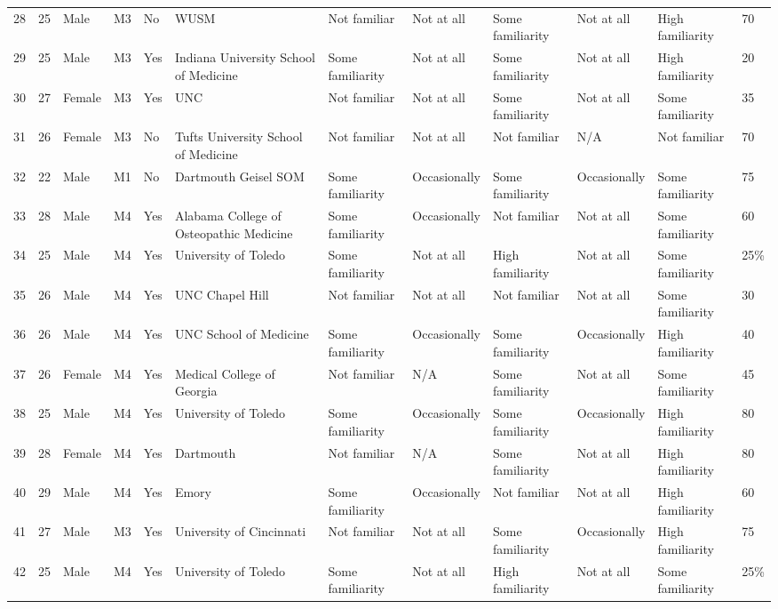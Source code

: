 \documentclass[11pt]{article}
\begin{document}
\begin{landscape}
{\begin{longtable}{rlllllllllll}
28 & 25 & Male & M3 & No & WUSM & Not familiar & Not at all & Some familiarity & Not at all & High familiarity & 70 \\
29 & 25 & Male & M3 & Yes & Indiana University School of Medicine & Some familiarity & Not at all & Some familiarity & Not at all & High familiarity & 20 \\
30 & 27 & Female & M3 & Yes & UNC & Not familiar & Not at all & Some familiarity & Not at all & Some familiarity & 35 \\
31 & 26 & Female & M3 & No & Tufts University School of Medicine & Not familiar & Not at all & Not familiar & N/A & Not familiar & 70 \\
32 & 22 & Male & M1 & No & Dartmouth Geisel SOM & Some familiarity & Occasionally & Some familiarity & Occasionally & Some familiarity & 75 \\
33 & 28 & Male & M4 & Yes & Alabama College of Osteopathic Medicine & Some familiarity & Occasionally & Not familiar & Not at all & Some familiarity & 60 \\
34 & 25 & Male & M4 & Yes & University of Toledo & Some familiarity & Not at all & High familiarity & Not at all & Some familiarity & 25\% \\
35 & 26 & Male & M4 & Yes & UNC Chapel Hill & Not familiar & Not at all & Not familiar & Not at all & Some familiarity & 30 \\
36 & 26 & Male & M4 & Yes & UNC School of Medicine & Some familiarity & Occasionally & Some familiarity & Occasionally & High familiarity & 40 \\
37 & 26 & Female & M4 & Yes & Medical College of Georgia & Not familiar & N/A & Some familiarity & Not at all & Some familiarity & 45 \\
38 & 25 & Male & M4 & Yes & University of Toledo & Some familiarity & Occasionally & Some familiarity & Occasionally & High familiarity & 80 \\
39 & 28 & Female & M4 & Yes & Dartmouth & Not familiar & N/A & Some familiarity & Not at all & High familiarity & 80 \\
40 & 29 & Male & M4 & Yes & Emory & Some familiarity & Occasionally & Not familiar & Not at all & High familiarity & 60 \\
41 & 27 & Male & M3 & Yes & University of Cincinnati & Not familiar & Not at all & Some familiarity & Occasionally & High familiarity & 75 \\
42 & 25 & Male & M4 & Yes & University of Toledo & Some familiarity & Not at all & High familiarity & Not at all & Some familiarity & 25\% \\

\end{longtable}}
\end{landscape}
\end{document}
